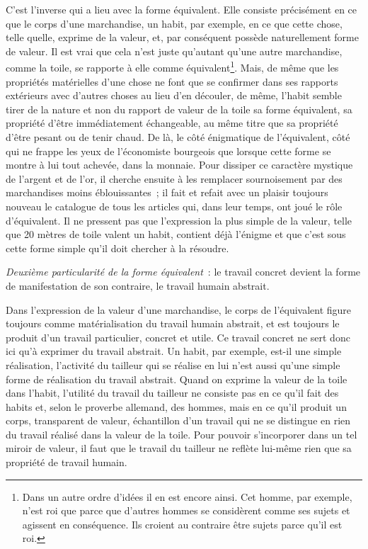 \documentclass[french,twoside]{book} %
\begin{document}
C’est l’inverse qui a lieu avec la forme équivalent. Elle consiste précisément en ce que le corps d’une marchandise, un habit, par exemple, en ce que cette chose, telle quelle, exprime de la valeur, et, par conséquent possède naturellement forme de valeur. Il est vrai que cela n’est juste qu’autant qu’une autre marchandise, comme la toile, se rapporte à elle comme équivalent\footnote{Dans un autre ordre d’idées il en est encore ainsi. Cet homme, par exemple, n’est roi que parce que d’autres hommes se considèrent comme ses sujets et agissent en conséquence. Ils croient au contraire être sujets parce qu’il est roi.}. Mais, de même que les propriétés matérielles d’une chose ne font que se confirmer dans ses rapports extérieurs avec d’autres choses au lieu d’en découler, de même, l’habit semble tirer de la nature et non du rapport de valeur de la toile sa forme équivalent, sa propriété d’être immédiatement échangeable, au même titre que sa propriété d’être pesant ou de tenir chaud. De là, le côté énigmatique de l’équivalent, côté qui ne frappe les yeux de l’économiste bourgeois que lorsque cette forme se montre à lui tout achevée, dans la monnaie. Pour dissiper ce caractère mystique de l’argent et de l’or, il cherche ensuite à les remplacer sournoisement par des marchandises moins éblouissantes ; il fait et refait avec un plaisir toujours nouveau le catalogue de tous les articles qui, dans leur temps, ont joué le rôle d’équivalent. Il ne pressent pas que l’expression la plus simple de la valeur, telle que 20 mètres de toile valent un habit, contient déjà l’énigme et que c’est sous cette forme simple qu’il doit chercher à la résoudre.\par
\emph{Deuxième particularité de la forme équivalent} : le travail concret devient la forme de manifestation de son contraire, le travail humain abstrait.\par
Dans l’expression de la valeur d’une marchandise, le corps de l’équivalent figure toujours comme matérialisation du travail humain abstrait, et est toujours le produit d’un travail particulier, concret et utile. Ce travail concret ne sert donc ici qu’à exprimer du travail abstrait. Un habit, par exemple, est-il une simple réalisation, l’activité du tailleur qui se réalise en lui n’est aussi qu’une simple forme de réalisation du travail abstrait. Quand on exprime la valeur de la toile dans l’habit, l’utilité du travail du tailleur ne consiste pas en ce qu’il fait des habits et, selon le proverbe allemand, des hommes, mais en ce qu’il produit un corps, transparent de valeur, échantillon d’un travail qui ne se distingue en rien du travail réalisé dans la valeur de la toile. Pour pouvoir s’incorporer dans un tel miroir de valeur, il faut que le travail du tailleur ne reflète lui-même rien que sa propriété de travail humain.\par
\end{document}
